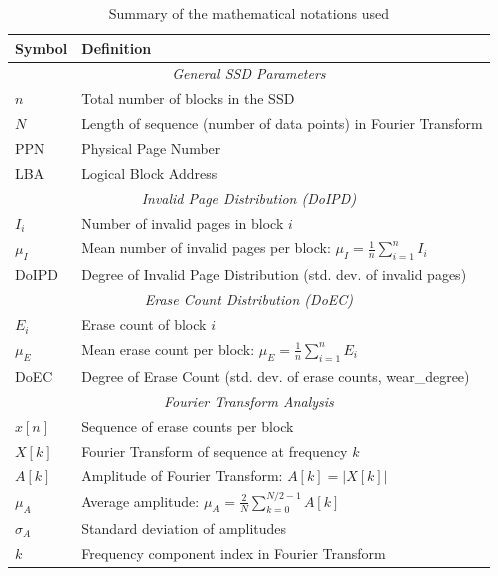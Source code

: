 \documentclass{ieeeaccess}
\begin{document}
\begin{table}[h]
 \centering
 \caption{Summary of the mathematical notations used}
 \label{table:math_notations}
 \begin{tabular}{|p{1.5cm}|p{6cm}|}
 \hline
 \textbf{Symbol} & \textbf{Definition} \\
 \hline
 \multicolumn{2}{|c|}{\textit{General SSD Parameters}} \\
 \hline
 $n$ & Total number of blocks in the SSD \\
 \hline
 $N$ & Length of sequence (number of data points) in Fourier Transform \\
 \hline
 PPN & Physical Page Number \\
 \hline
 LBA & Logical Block Address \\
 \hline
 \multicolumn{2}{|c|}{\textit{Invalid Page Distribution (DoIPD)}} \\
 \hline
 $I_i$ & Number of invalid pages in block $i$ \\
 \hline
 $\mu_I$ & Mean number of invalid pages per block: $\mu_I = \frac{1}{n}\sum_{i=1}^{n} I_i$ \\
 \hline
 DoIPD & Degree of Invalid Page Distribution (std. dev. of invalid pages) \\
 \hline
 \multicolumn{2}{|c|}{\textit{Erase Count Distribution (DoEC)}} \\
 \hline
 $E_i$ & Erase count of block $i$ \\
 \hline
 $\mu_E$ & Mean erase count per block: $\mu_E = \frac{1}{n}\sum_{i=1}^{n} E_i$ \\
 \hline
 DoEC & Degree of Erase Count (std. dev. of erase counts, wear\_degree) \\
 \hline
 \multicolumn{2}{|c|}{\textit{Fourier Transform Analysis}} \\
 \hline
 $x[n]$ & Sequence of erase counts per block \\
 \hline
 $X[k]$ & Fourier Transform of sequence at frequency $k$ \\
 \hline
 $A[k]$ & Amplitude of Fourier Transform: $A[k] = |X[k]|$ \\
 \hline
 $\mu_A$ & Average amplitude: $\mu_A = \frac{2}{N}\sum_{k=0}^{N/2-1} A[k]$ \\
 \hline
 $\sigma_A$ & Standard deviation of amplitudes \\
 \hline
 $k$ & Frequency component index in Fourier Transform \\
 \hline
 \end{tabular}
\end{table}
\end{document}

